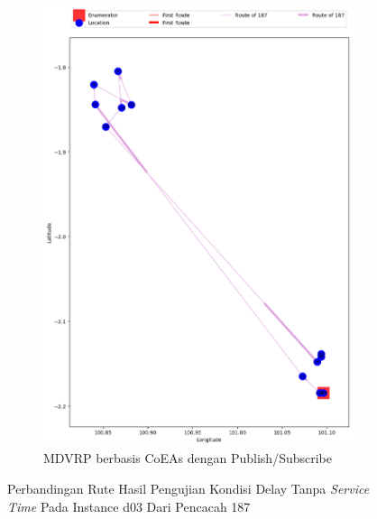 \begin{figure}[H]\ContinuedFloat
	\centering
	\begin{subfigure}[t]{\textwidth}
		\centering
		\includegraphics[width=\textwidth]{Resources/Images/delayed_3/real_m15_n100_delayed_3_187_pubsub_coes}
		\caption{MDVRP berbasis CoEAs dengan Publish/Subscribe}
		\label{fig:real_m15_n100_delayed_3_187_pubsub_coes}
	\end{subfigure}
	\caption{Perbandingan Rute Hasil Pengujian Kondisi Delay Tanpa \textit{Service Time} Pada Instance d03 Dari Pencacah 187}
	\label{fig:real_m15_n100_delayed_3_187_contd}
\end{figure}


